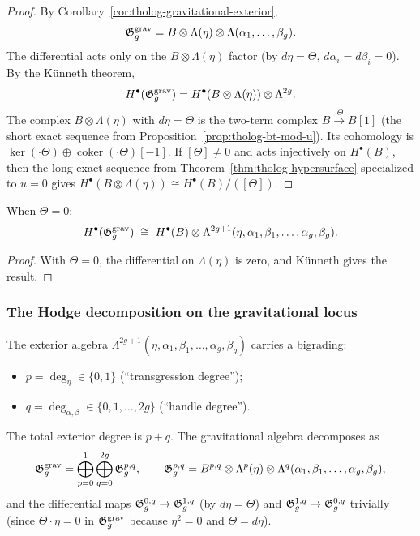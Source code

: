 \begin{proof}
By Corollary~\ref{cor:tholog-gravitational-exterior},
\[
\mathfrak{G}_g^{\mathrm{grav}}
= B \otimes \Lambda(\eta) \otimes \Lambda(\alpha_1,\dots,\beta_g).
\]
The differential acts only on the $B \otimes \Lambda(\eta)$
factor (by $d\eta = \Theta$, $d\alpha_i = d\beta_i = 0$).
By the K\"{u}nneth theorem,
\[
H^\bullet(\mathfrak{G}_g^{\mathrm{grav}})
= H^\bullet(B \otimes \Lambda(\eta)) \otimes \Lambda^{2g}.
\]
The complex $B \otimes \Lambda(\eta)$ with $d\eta = \Theta$
is the two-term complex $B \xrightarrow{\cdot\Theta} B[1]$
(the short exact sequence from
Proposition~\ref{prop:tholog-bt-mod-u}).
Its cohomology is
$\ker(\cdot\Theta) \oplus \operatorname{coker}(\cdot\Theta)[-1]$.
If $[\Theta] \neq 0$ and acts injectively on
$H^\bullet(B)$, then the long exact sequence from
Theorem~\ref{thm:tholog-hypersurface} specialized to
$u = 0$ gives $H^\bullet(B \otimes \Lambda(\eta))
\cong H^\bullet(B)/([\Theta])$.
\end{proof}

\begin{proposition}[Cohomology when $\Theta = 0$]
When $\Theta = 0$:
\[
H^\bullet(\mathfrak{G}_g^{\mathrm{grav}})
\;\cong\;
H^\bullet(B) \otimes \Lambda^{2g+1}(\eta,\alpha_1,\beta_1,\dots,\alpha_g,\beta_g).
\]
\end{proposition}

\begin{proof}
With $\Theta = 0$, the differential on $\Lambda(\eta)$ is zero,
and K\"{u}nneth gives the result.
\end{proof}

\subsubsection{The Hodge decomposition on the gravitational locus}

\begin{proposition}
The exterior algebra
$\Lambda^{2g+1}(\eta, \alpha_1, \beta_1, \dots, \alpha_g, \beta_g)$
carries a bigrading:
\begin{itemize}
\item $p = \deg_\eta \in \{0, 1\}$ (``transgression degree'');
\item $q = \deg_{\alpha,\beta} \in \{0, 1, \dots, 2g\}$
 (``handle degree'').
\end{itemize}
The total exterior degree is $p + q$.
The gravitational algebra decomposes as
\[
\mathfrak{G}_g^{\mathrm{grav}}
= \bigoplus_{p=0}^{1} \bigoplus_{q=0}^{2g}
\mathfrak{G}_g^{p,q},
\qquad
\mathfrak{G}_g^{p,q} = B^{p,q} \otimes \Lambda^p(\eta) \otimes
\Lambda^q(\alpha_1,\beta_1,\dots,\alpha_g,\beta_g),
\]
and the differential maps $\mathfrak{G}_g^{0,q} \to \mathfrak{G}_g^{1,q}$
(by $d\eta = \Theta$) and $\mathfrak{G}_g^{1,q} \to \mathfrak{G}_g^{0,q}$
trivially (since $\Theta \cdot \eta = 0$ in
$\mathfrak{G}_g^{\mathrm{grav}}$ because $\eta^2 = 0$ and
$\Theta = d\eta$).
\end{proposition}

